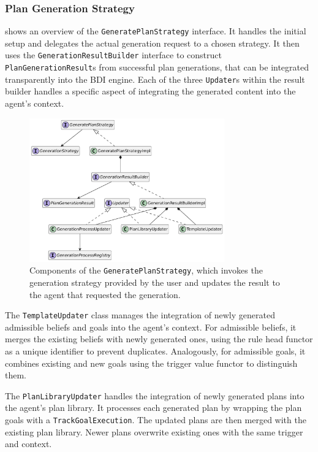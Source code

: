 \documentclass[12pt,a4paper,openright,twoside]{book}
\begin{document}
\subsubsection{Plan Generation Strategy}\label{sec:plan-gen-strategy}

 shows an overview of the \texttt{GeneratePlanStrategy} interface.
%
It handles the initial setup and delegates the actual generation request to a chosen strategy.
%
It then uses the \texttt{GenerationResultBuilder} interface to construct \\ \texttt{PlanGenerationResult}s from successful plan generations, that can be integrated transparently into the \ac{BDI} engine.
%
Each of the three \texttt{Updater}s within the result builder handles a specific aspect of integrating the generated content into the agent's context.

\begin{figure}
    \centering
    \includegraphics[width=0.75\textwidth]{figures/plan-gen.pdf}
    \caption{Components of the \texttt{GeneratePlanStrategy}, which invokes the generation strategy provided by the user and updates the result to the agent that requested the generation.}
    \label{fig:plan-gen}
\end{figure}

The \texttt{TemplateUpdater} class manages the integration of newly generated admissible beliefs and goals into the agent's context.
%
For admissible beliefs, it merges the existing beliefs with newly generated ones, using the rule head functor as a unique identifier to prevent duplicates.
%
Analogously, for admissible goals, it combines existing and new goals using the trigger value functor to distinguish them.

The \texttt{PlanLibraryUpdater} handles the integration of newly generated plans into the agent's plan library. 
%
It processes each generated plan by wrapping the plan goals with a \texttt{TrackGoalExecution}.
%
The updated plans are then merged with the existing plan library.
%
Newer plans overwrite existing ones with the same trigger and context.
\end{document}
